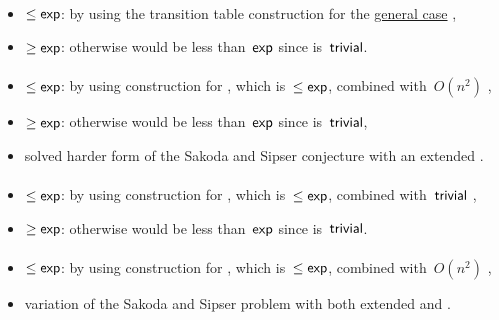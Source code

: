 \paragraph{\OLA{}\tto\ONFA}\label{cost:1DLAto1NFAu}
\begin{itemize}
	\item $\le\mathsf{exp}$: by using the transition table construction for the \hyperref[cost:1LAto1NFA]{general case} \cite{PigPis14},
	\item $\ge\mathsf{exp}$: otherwise \hyperref[cost:1DLAto1NFAu]{\ODLA{}\tto\ONFA} would be less than~$\mathsf{exp}$ since \ODLA{}\tto\OLA is~$\mathsf{trivial}$.
\end{itemize}
\paragraph{\OLA{}\tto\TDFA}
\begin{itemize}
	\item $\le\mathsf{exp}$: by using construction for \hyperref[cost:1LAto1NFAu]{\OLA{}\tto\ONFA}, which is~$\le\mathsf{exp}$, combined with~$O(n^2)$ \hyperref[cost:1NFAto2DFAu]{\ONFA{}\tto\TDFA},
	\item $\ge\mathsf{exp}$: otherwise \hyperref[cost:1DLAto2DFAu]{\ODLA{}\tto\TDFA} would be less than~$\mathsf{exp}$ since \ODLA{}\tto\OLA is~$\mathsf{trivial}$,
	\item solved harder form of the Sakoda and Sipser conjecture with an extended \TNFA.
\end{itemize}
\paragraph{\OLA{}\tto\TNFA}
\begin{itemize}
	\item $\le\mathsf{exp}$: by using construction for \hyperref[cost:1LAto1NFAu]{\OLA{}\tto\ONFA}, which is~$\le\mathsf{exp}$, combined with~$\mathsf{trivial}$ \ONFA{}\tto\TNFA,
	\item $\ge\mathsf{exp}$: otherwise \hyperref[cost:1DLAto2NFAu]{\ODLA{}\tto\TNFA} would be less than~$\mathsf{exp}$ since \ODLA{}\tto\OLA is~$\mathsf{trivial}$.
\end{itemize}
\paragraph{\OLA{}\tto\ODLA}
\begin{itemize}
	\item $\le\mathsf{exp}$: by using construction for \hyperref[cost:1LAto1NFAu]{\OLA{}\tto\ONFA}, which is~$\le\mathsf{exp}$, combined with~$O(n^2)$ \hyperref[cost:1NFAto1DLAu]{\ONFA{}\tto\ODLA},
	\item variation of the Sakoda and Sipser problem with both extended \TNFA and \TDFA.
\end{itemize}


